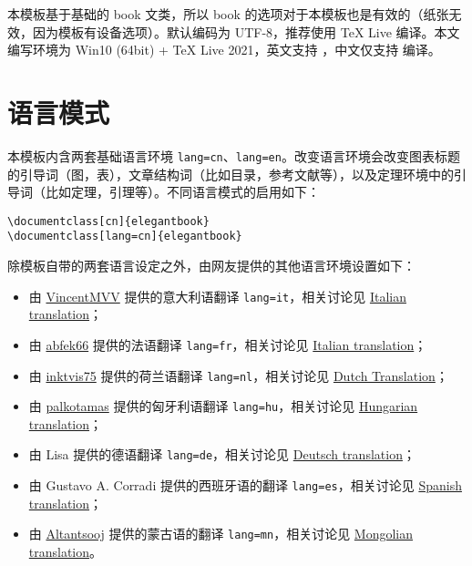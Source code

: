 \documentclass[cn,10pt,math=newtx,citestyle=gb7714-2015,bibstyle=gb7714-2015]{elegantbook}
\begin{document}
本模板基于基础的 book 文类，所以 book 的选项对于本模板也是有效的（纸张无效，因为模板有设备选项）。默认编码为 UTF-8，推荐使用 \TeX{} Live 编译。本文编写环境为 Win10 (64bit) + \TeX{} Live 2021，英文支持 ，中文仅支持  编译。

\section{语言模式}
本模板内含两套基础语言环境 \lstinline{lang=cn}、\lstinline{lang=en}。改变语言环境会改变图表标题的引导词（图，表），文章结构词（比如目录，参考文献等），以及定理环境中的引导词（比如定理，引理等）。不同语言模式的启用如下：
\begin{lstlisting}
\documentclass[cn]{elegantbook} 
\documentclass[lang=cn]{elegantbook}
\end{lstlisting}

除模板自带的两套语言设定之外，由网友提供的其他语言环境设置如下：
\begin{itemize}
  \item 由 \href{https://github.com/VincentMVV}{VincentMVV} 提供的意大利语翻译 \lstinline{lang=it}，相关讨论见 \href{https://github.com/ElegantLaTeX/ElegantBook/issues/85}{Italian translation}；
  \item 由 \href{https://github.com/abfek66}{abfek66} 提供的法语翻译 \lstinline{lang=fr}，相关讨论见 \href{https://github.com/ElegantLaTeX/ElegantBook/issues/85}{Italian translation}；
  \item 由 \href{https://github.com/inktvis75}{inktvis75} 提供的荷兰语翻译 \lstinline{lang=nl}，相关讨论见 \href{https://github.com/ElegantLaTeX/ElegantBook/issues/108}{Dutch Translation}；
  \item 由 \href{https://github.com/palkotamas}{palkotamas} 提供的匈牙利语翻译 \lstinline{lang=hu}，相关讨论见 \href{https://github.com/ElegantLaTeX/ElegantBook/issues/111}{Hungarian translation}；
  \item 由 Lisa 提供的德语翻译 \lstinline{lang=de}，相关讨论见 \href{https://github.com/ElegantLaTeX/ElegantBook/issues/113}{Deutsch translation}；
  \item 由 Gustavo A. Corradi 提供的西班牙语的翻译 \lstinline{lang=es}，相关讨论见 \href{https://github.com/ElegantLaTeX/ElegantBook/issues/133}{Spanish translation}；
  \item 由 \href{https://github.com/Altantsooj}{Altantsooj} 提供的蒙古语的翻译 \lstinline{lang=mn}，相关讨论见 \href{https://github.com/ElegantLaTeX/ElegantBook/issues/137}{Mongolian translation}。
\end{itemize}
\end{document}
